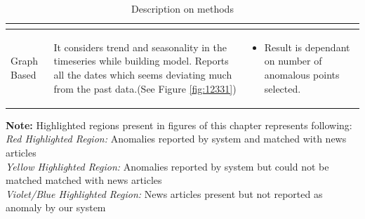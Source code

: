 \documentclass[a4paper,10pt]{article}
\begin{document}
\begin{table}[H]
{\begin{tabular}{|L{3cm} | L{5cm} | L{8cm}|}
\begin{itemize}
                                                                                                                                                                                                                                                                                                                 \end{itemize}                                                                                                                                                                                                                                                                                                                                                \\ \hline
Graph Based                           & It considers trend and seasonality in the timeseries while building model. Reports all the dates which seems deviating much from the past data.(See Figure \ref{fig:12331})                                                                                                     & \begin{itemize}
                                                                                                                                                                                                                                                                                                                  \item Result is dependant on number of anomalous points selected. 
                                                                                                                                                                                                                                                                                                                 \end{itemize}                                                                                                                                                                                                                                                                                                                              \\ \hline
	\end{tabular}}
	\caption{Description on methods}
	\label{table:MethodDescription}
\end{table}

\textbf{Note:} Highlighted regions present in figures of this chapter represents following:\\
\textit{Red Highlighted Region:} Anomalies reported by system and matched with news articles\\
\textit{Yellow Highlighted Region:} Anomalies reported by system but could not be matched matched with news articles\\
\textit{Violet/Blue Highlighted Region:} News articles present but not reported as anomaly by our system\\
\\
\end{document}
